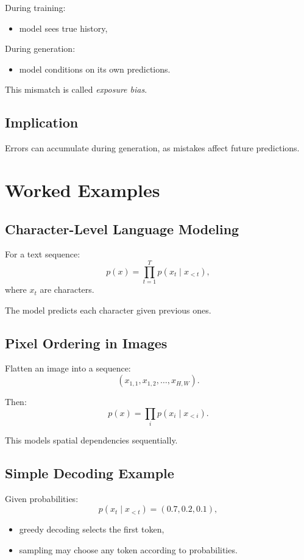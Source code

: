 During training:
\begin{itemize}
    \item model sees true history,
\end{itemize}

During generation:
\begin{itemize}
    \item model conditions on its own predictions.
\end{itemize}

This mismatch is called \emph{exposure bias}.

\subsection{Implication}

Errors can accumulate during generation, as mistakes affect future predictions.

\section{Worked Examples}

\subsection{Character-Level Language Modeling}

For a text sequence:
\[
p(x) = \prod_{t=1}^T p(x_t \mid x_{<t}),
\]
where $x_t$ are characters.

The model predicts each character given previous ones.

\subsection{Pixel Ordering in Images}

Flatten an image into a sequence:
\[
(x_{1,1}, x_{1,2}, \dots, x_{H,W}).
\]

Then:
\[
p(x) = \prod_i p(x_i \mid x_{<i}).
\]

This models spatial dependencies sequentially.

\subsection{Simple Decoding Example}

Given probabilities:
\[
p(x_t \mid x_{<t}) = (0.7, 0.2, 0.1),
\]
\begin{itemize}
    \item greedy decoding selects the first token,
    \item sampling may choose any token according to probabilities.
\end{itemize}

